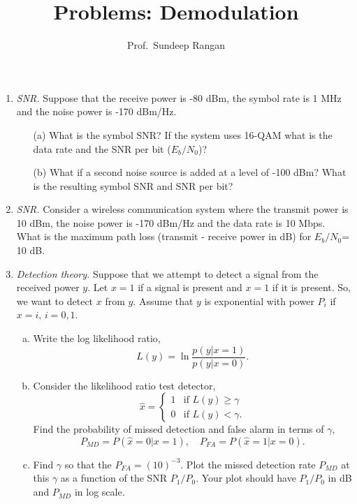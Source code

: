 \documentclass[11pt]{article}
\begin{document}
\title{Problems:  Demodulation}
\author{Prof.\ Sundeep Rangan}
\date{}

\maketitle

\begin{enumerate}

\item \emph{SNR.} 
Suppose that the receive power is -80 dBm, the symbol rate is 1 MHz and
the noise power is -170 dBm/Hz.
\begin{itemize}
\item[(a)] What is the symbol SNR?  If the system uses
16-QAM what is the data rate and the SNR per bit ($E_b/N_0$)?
\item[(b)] What if a second noise source is added at a level of -100 dBm?
What is the resulting symbol SNR and SNR per bit?
\end{itemize}

\item \emph{SNR.}
Consider a wireless communication system where the
transmit power is 10 dBm, the noise power is -170 dBm/Hz and the data rate is 10 Mbps.
What is the maximum path loss (transmit - receive power in dB) for $E_b/N_0$= 10 dB.

\item \emph{Detection theory.} 
Suppose that we attempt to detect a signal from the received power $y$.
Let $x=1$ if a signal is present and $x=1$ if it is present.  So, we want to detect $x$ from $y$.
Assume that $y$ is exponential with power $P_i$ if $x=i$, $i=0,1$.
\begin{enumerate}[(a)]
\item Write the log likelihood ratio,
\[
    L(y) = \ln \frac{p(y|x=1)}{p(y|x=0)}.
\]

\item Consider the likelihood ratio test detector,
\[
    \hat{x} = \begin{cases}
        1 &  \mbox{if } L(y) \geq \gamma \\
        0 &  \mbox{if } L(y) < \gamma.
    \end{cases}
\]
Find the probability of missed detection and false alarm in terms of $\gamma$,
\[
    P_{MD} = P(\hat{x}=0|x=1), \quad
    P_{FA} = P(\hat{x}=1|x=0).
\]

\item Find $\gamma$ so that the $P_{FA}=(10)^{-3}$.   Plot the missed detection rate $P_{MD}$ at this $\gamma$
as a function of the SNR $P_1/P_0$.  Your plot should have $P_1/P_0$ in dB and $P_{MD}$ in log scale.


\end{enumerate}
\end{enumerate}
\end{document}
